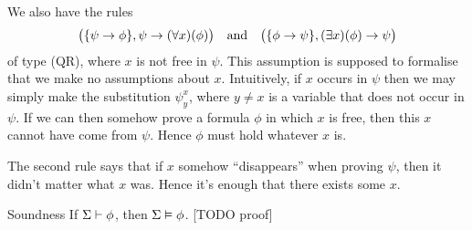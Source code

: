 \documentclass[article, a4paper, 11pt, oneside]{memoir}
\numberwithin{equation}{chapter}
\theoremstyle{nonumberplain}
\begin{document}
\begin{notelist}
    We also have the rules
    \begin{equation*}
        \bigl( \{ \psi \rightarrow \phi \}, \psi \rightarrow (\forall x)(\phi) \bigr)
        \quad \text{and} \quad
        \bigl( \{ \phi \rightarrow \psi \}, (\exists x)(\phi) \rightarrow \psi \bigr)
    \end{equation*}
    of type (QR), where $x$ is not free in $\psi$. This assumption is supposed to formalise that we make no assumptions about $x$. Intuitively, if $x$ occurs in $\psi$ then we may simply make the substitution $\psi^x_y$, where $y \neq x$ is a variable that does not occur in $\psi$. If we can then somehow prove a formula $\phi$ in which $x$ is free, then this $x$ cannot have come from $\psi$. Hence $\phi$ must hold whatever $x$ is.
    
    The second rule says that if $x$ somehow \enquote{disappears} when proving $\psi$, then it didn't matter what $x$ was. Hence it's enough that there exists some $x$.

    \item[Soundness]
    If $\Sigma \vdash \phi$, then $\Sigma \vDash \phi$. [TODO proof]
\end{notelist}
\end{document}
